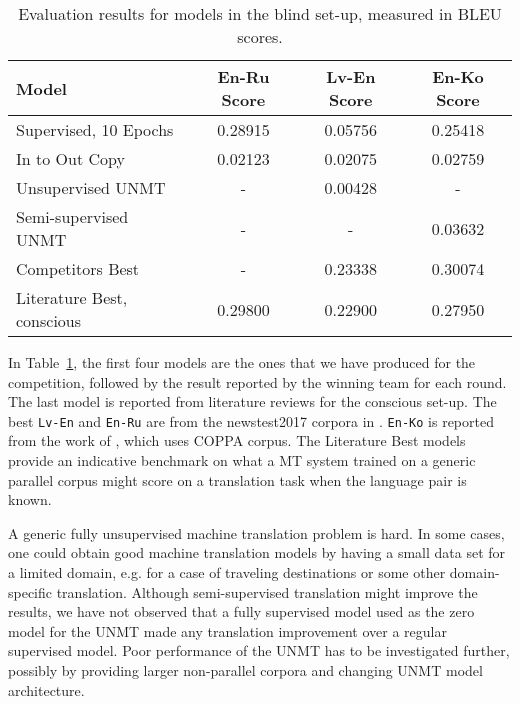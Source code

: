 \documentclass[]{article}
\begin{document}
\begin{table}
\begin{center}
\begin{tabular}{ l c c c }
Model & En-Ru Score & Lv-En Score & En-Ko Score \\
\hline
Supervised, 10 Epochs & 0.28915 & 0.05756 & 0.25418 \\
In to Out Copy & 0.02123 & 0.02075 & 0.02759 \\
Unsupervised UNMT & - & 0.00428 & - \\
Semi-supervised UNMT & - & - & 0.03632 \\
Competitors Best & - & 0.23338 & 0.30074 \\
Literature Best, conscious & 0.29800 & 0.22900 & 0.27950
\end{tabular}
\end{center}
\caption{Evaluation results for models in the blind set-up, measured in BLEU scores.}
\label{table:results}
\end{table}

In Table~\ref{table:results}, the first four models are the ones that we have produced for the competition, followed by the result reported by the winning team for each round.
The last model is reported from literature reviews for the conscious set-up.
The best {\tt Lv-En} and  {\tt En-Ru} are from the newstest2017 corpora in \cite{bojar2017findings}.
{\tt En-Ko} is reported from the work of \cite{junczys2016coppa}, which uses COPPA corpus.
The Literature Best models provide an indicative benchmark on what a \ac{MT} system trained on a generic parallel corpus might score on a translation task when the language pair is known.

A generic fully unsupervised machine translation problem is hard.
In some cases, one could obtain good machine translation models by having a small data set for a limited domain, e.g. for a case of traveling destinations or some other domain-specific translation.
Although semi-supervised translation might improve the results, we have not observed that a fully supervised model used as the zero model for the \ac{UNMT} made any translation improvement over a regular supervised model.
Poor performance of the \ac{UNMT} has to be investigated further, possibly by providing larger non-parallel corpora and changing \ac{UNMT} model architecture.

\small



\end{document}
